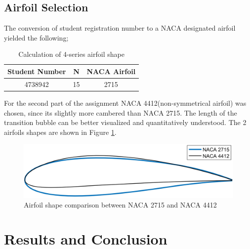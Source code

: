 \documentclass[main.tex]{subfiles}
\begin{document}
\subsection{Airfoil Selection}
The conversion of student registration number to a NACA designated airfoil yielded the following;
\begin{table}[b]
\begin{center}
\begin{tabular}{ c c c } 
 \hline
 \rowcolor{lightgray}
 Student Number & N & NACA Airfoil \\
 \hline
 4738942 & 15 & 2715  \\ 
 \hline
\end{tabular}
\label{table1}
 \caption{Calculation of 4-series airfoil shape}
\end{center}
\end{table}
For the second part of the assignment NACA 4412(non-symmetrical airfoil) was chosen, since its slightly more cambered than NACA 2715. The length of the transition bubble can be better visualized and quantitatively understood. The 2 airfoils shapes are shown in Figure \ref{Fig1}.\vspace*{-0.5em}
\begin{figure}[h]
\centering
\includegraphics[scale=0.06]{./Images/Ass2/Airfoil_Comparison} 
\caption{Airfoil shape comparison between NACA 2715 and NACA 4412}\vspace*{-0.9em}
\label{Fig1}
\end{figure}
\section{Results and Conclusion}\vspace*{-0.9em}
\end{document}
